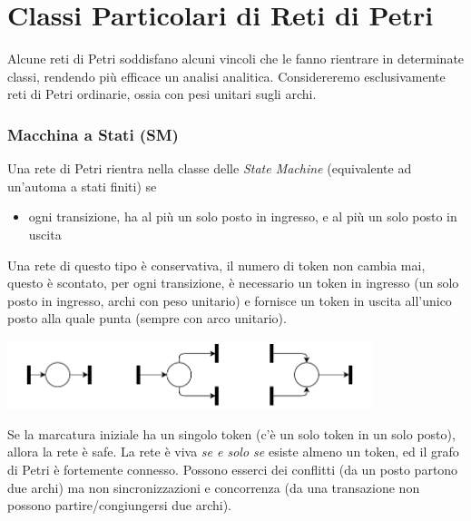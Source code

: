 \documentclass[10pt, letterpaper]{report}
\begin{document}
\section{Classi Particolari di Reti di Petri}
Alcune reti di Petri soddisfano alcuni vincoli che le fanno rientrare in determinate classi, rendendo più efficace un analisi analitica. Considereremo esclusivamente reti di Petri ordinarie, ossia con pesi unitari sugli archi.
\subsubsection{Macchina a Stati (SM)}
Una rete di Petri rientra nella classe delle \textit{State Machine} (equivalente ad un'automa a stati finiti) se\begin{itemize}
    \item ogni transizione, ha al più un solo posto in ingresso, e al più un solo posto in uscita
\end{itemize}
Una rete di questo tipo è conservativa, il numero di token non cambia mai, questo è scontato, per ogni transizione, è necessario un token in ingresso (un solo posto in ingresso, archi con peso unitario) e fornisce un token in uscita all'unico posto alla quale punta (sempre con arco unitario).\begin{center}
    \includegraphics[width=0.8\textwidth]{images/PetriSM.drawio.pdf}
\end{center}
Se la marcatura iniziale ha un singolo token (c'è un solo token in un solo posto), allora la rete è safe. La rete è viva \textit{se e solo se} esiste almeno un token, ed il grafo di Petri è fortemente connesso. Possono esserci dei conflitti (da un posto partono due archi) ma non sincronizzazioni e concorrenza (da una transazione non possono partire/congiungersi due archi).
\end{document}
